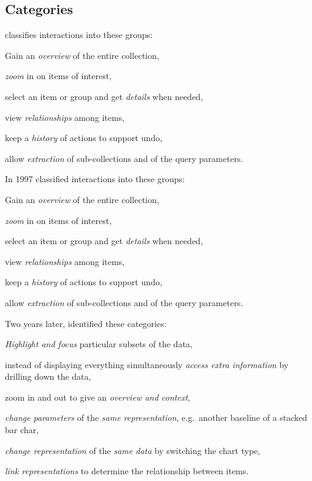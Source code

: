 \documentclass{article}
\begin{document}
\subsection{Categories}\label{sec:related-work:categories}
\textcite{Shneiderman1996} classifies interactions into these groups:
\begin{enumerate*}[label=(\arabic*)]
  \item
    Gain an \emph{overview} of the entire collection,
  \item
    \emph{zoom} in on items of interest,
  \item
    select an item or group and get \emph{details} when needed,
  \item
    view \emph{relationships} among items,
  \item
    keep a \emph{history} of actions to support undo,
  \item
    allow \emph{extraction} of sub-collections and of the query parameters.
\end{enumerate*}

In 1997 \textcite{Shneiderman1996} classified interactions into these groups:
\begin{enumerate*}[label=(\arabic*)]
  \item
    Gain an \emph{overview} of the entire collection,
  \item
    \emph{zoom} in on items of interest,
  \item
    select an item or group and get \emph{details} when needed,
  \item
    view \emph{relationships} among items,
  \item
    keep a \emph{history} of actions to support undo,
  \item
    allow \emph{extraction} of sub-collections and of the query parameters.
\end{enumerate*}

Two years later, \textcite{Dix1998} identified these categories:
\begin{enumerate*}[label=(\arabic*)]
  \item
    \emph{Highlight and focus} particular subsets of the data,
  \item
    instead of displaying everything simultaneously \emph{access extra information} by drilling down the data,
  \item
    zoom in and out to give an \emph{overview and context},
  \item
    \emph{change parameters} of the \emph{same representation}, e.g.\ another baseline of a stacked bar char,
  \item
    \emph{change representation} of the \emph{same data} by switching the chart type,
  \item
    \emph{link representations} to determine the relationship between items.
\end{enumerate*}
\end{document}

